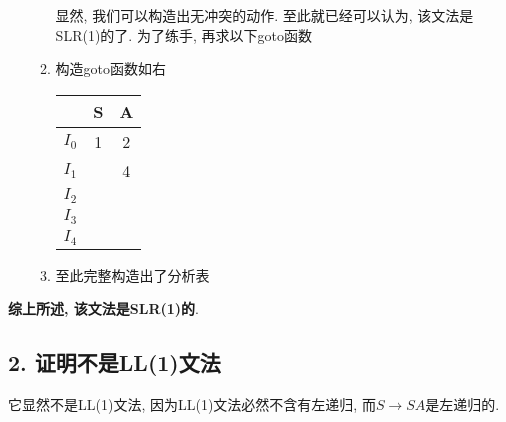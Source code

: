\documentclass[UTF8]{article}
\begin{document}
\begin{itemize}
\begin{enumerate}[(1) ]
\begin{center}
		\end{center}
		显然, 我们可以构造出无冲突的动作. 至此就已经可以认为, 该文法是SLR(1)的了. 为了练手, 再求以下goto函数
		\item 构造goto函数如右
		\begin{tabular}{|c|c|c|}
		\hline
		 & S & A \\
		\hline
		$I_0$ & 1 & 2 \\
		\hline
		$I_1$ &  & 4 \\
		\hline
		$I_2$ &  &  \\
		\hline
		$I_3$ &  &  \\
		\hline
		$I_4$ &  &  \\
		\hline
		\end{tabular}
		\item 至此完整构造出了分析表
	\end{enumerate}
\end{itemize}
\textbf{综上所述, 该文法是SLR(1)的}.

\subsection*{2. 证明不是LL(1)文法}
它显然不是LL(1)文法, 因为LL(1)文法必然不含有左递归, 而$S\rightarrow SA$是左递归的.
\end{document}
